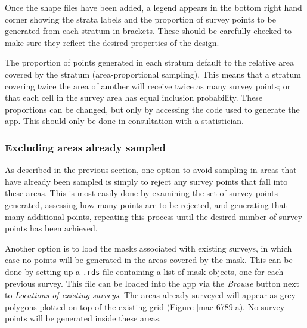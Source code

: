 \documentclass[a4paper,11pt]{article} %
\begin{document}
Once the shape files have been added, a legend appears in the bottom right hand corner showing the strata labels and the proportion of survey points to be generated from each stratum in brackets. These should be carefully checked to make sure they reflect the desired properties of the design. 

The proportion of points generated in each stratum default to the relative area covered by the stratum (area-proportional sampling). This means that a stratum covering twice the area of another will receive twice as many survey points; or that each cell in the survey area has equal inclusion probability. These proportions can be changed, but only by accessing the code used to generate the app. This should only be done in consultation with a statistician.

\subsubsection{Excluding areas already sampled}
As described in the previous section, one option to avoid sampling in areas that have already been sampled is simply to reject any survey points that fall into these areas. This is most easily done by examining the set of survey points generated, assessing how many points are to be rejected, and generating that many additional points, repeating this process until the desired number of survey points has been achieved. 

Another option is to load the masks associated with existing surveys, in which case no points will be generated in the areas covered by the mask. This can be done by setting up a \texttt{.rds} file containing a list of mask objects, one for each previous survey. This file can be loaded into the app via the \textit{Browse} button next to \textit{Locations of existing surveys}. The areas already surveyed will appear as grey polygons plotted on top of the existing grid (Figure \ref{mac-6789}a). No survey points will be generated inside these areas. 
\end{document}
